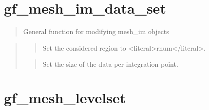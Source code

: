 \documentclass[a4paper,11pt,english]{sphinxmanual}
\begin{document}
\section{gf\_mesh\_im\_data\_set}
\label{\detokenize{scilab/cmdref_gf_mesh_im_data_set:gf-mesh-im-data-set}}\label{\detokenize{scilab/cmdref_gf_mesh_im_data_set::doc}}
\sphinxAtStartPar
{}

\begin{sphinxVerbatim}[commandchars=\\\{\}]
    
  
\end{sphinxVerbatim}

\sphinxAtStartPar
{}
\begin{quote}

\sphinxAtStartPar
General function for modifying mesh\_im objects
\end{quote}

\sphinxAtStartPar
{}
\begin{quote}

\sphinxAtStartPar
{}
\begin{quote}

\sphinxAtStartPar
Set the considered region to \textless{}literal\textgreater{}rnum\textless{}/literal\textgreater{}.
\end{quote}

\sphinxAtStartPar
{}
\begin{quote}

\sphinxAtStartPar
Set the size of the data per integration point.
\end{quote}
\end{quote}


\section{gf\_mesh\_levelset}
\label{\detokenize{scilab/cmdref_gf_mesh_levelset:gf-mesh-levelset}}\label{\detokenize{scilab/cmdref_gf_mesh_levelset::doc}}
\sphinxAtStartPar
{}
\end{document}
